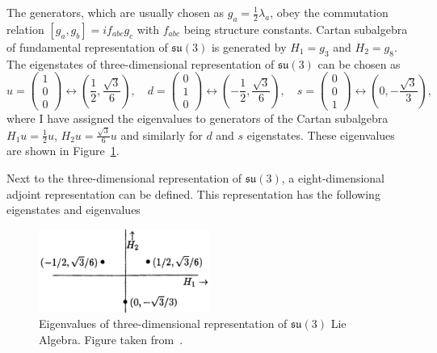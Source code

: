 The generators, which are usually chosen as $g_a = \frac{1}{2} \lambda_a$, obey the
commutation relation $[g_a,g_b]=if_{abc}g_c$ with $f_{abc}$ being structure
constants. Cartan subalgebra of fundamental representation of $\mathfrak{su}(3)$
is generated by $H_1=g_3$ and $H_2=g_8$. The eigenstates of three-dimensional
representation of $\mathfrak{su}(3)$ can be chosen as
\small
\begin{equation}
  u = \begin{pmatrix} 1 \\ 0 \\ 0 \end{pmatrix} \leftrightarrow \left(
    \frac{1}{2}, \frac{\sqrt{3}}{6} \right), \quad
  d = \begin{pmatrix} 0 \\ 1 \\ 0 \end{pmatrix} \leftrightarrow \left(
    - \frac{1}{2}, \frac{\sqrt{3}}{6} \right), \quad
  s = \begin{pmatrix} 0 \\ 0 \\ 1 \end{pmatrix} \leftrightarrow \left(
    0, - \frac{\sqrt{3}}{3} \right), \quad
  \label{eq:RepresentLie3}
\end{equation}
\normalsize
where I have assigned the eigenvalues to generators of the Cartan subalgebra 
$H_1 u = \frac{1}{2} u$, $H_2 u = \frac{\sqrt{3}}{6} u$ and similarly
for $d$ and $s$ eigenstates. 
These eigenvalues are shown in Figure~\ref{fig:QuarkTriplet}. 

Next to the three-dimensional representation of $\mathfrak{su}(3)$, a
eight-dimensional adjoint representation can be defined.
This representation has the following eigenstates and eigenvalues

\begin{figure}
  \centering
  \includegraphics[width=0.5\textwidth]{Chapter1/Quark-triplet.png} 
  \caption[Eigenvalues of three-dimensional representation of $\mathfrak{su}(3)$
          Lie Algebra.]
          {Eigenvalues of three-dimensional representation of $\mathfrak{su}(3)$ Lie
          Algebra. Figure taken from~\cite{LieAlgebrasForParticlePhysicists}.}
  \label{fig:QuarkTriplet}
\end{figure}

